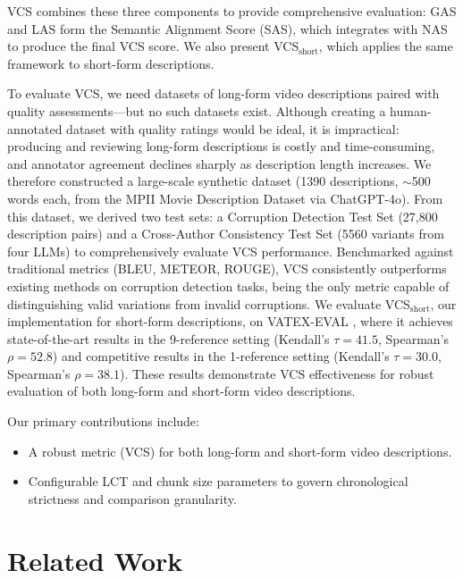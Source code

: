 \documentclass[letterpaper]{article} %
\begin{document}
VCS combines these three components to provide comprehensive evaluation: GAS and LAS form the Semantic Alignment Score (SAS), which integrates with NAS to produce the final VCS score. We also present VCS$_{\text{short}}$, which applies the same framework to short-form descriptions.

To evaluate VCS, we need datasets of long-form video descriptions paired with quality assessments—but no such datasets exist. Although creating a human-annotated dataset with quality ratings would be ideal, it is impractical: producing and reviewing long-form descriptions is costly and time-consuming, and annotator agreement declines sharply as description length increases. We therefore constructed a large-scale synthetic dataset (1390 descriptions, $\sim$500 words each, from the MPII Movie Description Dataset \citep{rohrbach2015dataset} via ChatGPT-4o). From this dataset, we derived two test sets: a Corruption Detection Test Set (27,800 description pairs) and a Cross-Author Consistency Test Set (5560 variants from four LLMs) to comprehensively evaluate VCS performance. Benchmarked against traditional metrics (BLEU, METEOR, ROUGE), VCS consistently outperforms existing methods on corruption detection tasks, being the only metric capable of distinguishing valid variations from invalid corruptions. We evaluate VCS$_{\text{short}}$, our implementation for short-form descriptions, on VATEX-EVAL \citep{syxl:22}, where it achieves state-of-the-art results in the 9-reference setting (Kendall's $\tau = 41.5$, Spearman's $\rho = 52.8$) and competitive results in the 1-reference setting (Kendall's $\tau = 30.0$, Spearman's $\rho = 38.1$). These results demonstrate VCS effectiveness for robust evaluation of both long-form and short-form video descriptions.

Our primary contributions include:
\begin{itemize}
\item A robust metric (VCS) for both long-form and short-form video descriptions.
\item Configurable LCT and chunk size parameters to govern chronological strictness and comparison granularity.
\end{itemize}

\section{Related Work}
\end{document}
